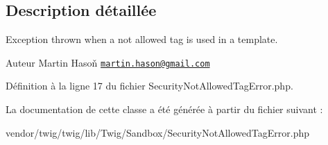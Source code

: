 \subsection{Description détaillée}
Exception thrown when a not allowed tag is used in a template.

\begin{DoxyAuthor}{Auteur}
Martin Hasoň \href{mailto:martin.hason@gmail.com}{\tt martin.\+hason@gmail.\+com} 
\end{DoxyAuthor}


Définition à la ligne 17 du fichier Security\+Not\+Allowed\+Tag\+Error.\+php.



La documentation de cette classe a été générée à partir du fichier suivant \+:\begin{DoxyCompactItemize}
\item 
vendor/twig/twig/lib/\+Twig/\+Sandbox/Security\+Not\+Allowed\+Tag\+Error.\+php\end{DoxyCompactItemize}
